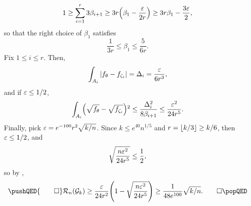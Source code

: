 \[
  1 \ge \sum_{i = 1}^r 3 \beta_{i + 1} \ge 3 r \left( \beta_1 - \frac{\eps}{2r} \right) \ge 3r \beta_1 - \frac{3 \eps }{2} ,
\]
so that the right choice of $\beta_1$ satisfies
\[
  \frac{1}{3r} \le \beta_1 \le \frac{5}{6r} .
\]
Fix $1 \le i \le r$. Then,
\begin{align*}
  \int_{A_i} |f_\theta - f_{\zeta_i}| = \Delta_i = \frac{\eps}{6 r^3} ,
\end{align*}
and if $\varepsilon \le 1/2$,
\begin{align*}
  \int_{A_i} \left(\sqrt{f_\theta} - \sqrt{f_{\zeta_i}}\right)^2 \le \frac{\Delta_i^2}{8 \beta_{i + 1}} \le \frac{\eps^2}{24 r^5} .
\end{align*}
Finally, pick $\varepsilon = e^{-100} r^2 \sqrt{k/n}$. Since
$k \le e^{40} n^{1/5}$ and $r = {\lfloor k/3 \rfloor} \ge k/6$, then
$\varepsilon \le 1/2$, and
\[
  \sqrt{\frac{n \varepsilon^2}{24 r^5}} \le \frac{1}{2} ,
\]
so by ,
\[
  \pushQED{\qed}
  \sR_n(\sG_k) \ge \frac{\eps}{24 r^2} \left(1 - \sqrt{\frac{n \eps^2}{24 r^5}}\right) \ge \frac{1}{48 e^{100}} \sqrt{k/n} . \qedhere
  \popQED
\]
